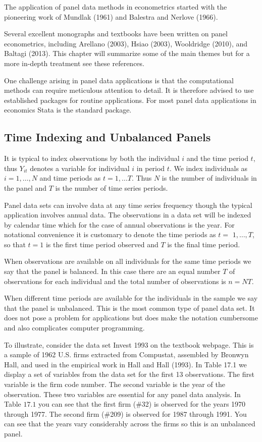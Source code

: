 \documentclass[10pt]{article}
\begin{document}
The application of panel data methods in econometrics started with the pioneering work of Mundlak (1961) and Balestra and Nerlove (1966).

Several excellent monographs and textbooks have been written on panel econometrics, including Arellano (2003), Hsiao (2003), Wooldridge (2010), and Baltagi (2013). This chapter will summarize some of the main themes but for a more in-depth treatment see these references.

One challenge arising in panel data applications is that the computational methods can require meticulous attention to detail. It is therefore advised to use established packages for routine applications. For most panel data applications in economics Stata is the standard package.

\subsection{Time Indexing and Unbalanced Panels}
It is typical to index observations by both the individual $i$ and the time period $t$, thus $Y_{i t}$ denotes a variable for individual $i$ in period $t$. We index individuals as $i=1, \ldots, N$ and time periods as $t=1, \ldots T$. Thus $N$ is the number of individuals in the panel and $T$ is the number of time series periods.

Panel data sets can involve data at any time series frequency though the typical application involves annual data. The observations in a data set will be indexed by calendar time which for the case of annual observations is the year. For notational convenience it is customary to denote the time periods as $t=$ $1, \ldots, T$, so that $t=1$ is the first time period observed and $T$ is the final time period.

When observations are available on all individuals for the same time periods we say that the panel is balanced. In this case there are an equal number $T$ of observations for each individual and the total number of observations is $n=N T$.

When different time periods are available for the individuals in the sample we say that the panel is unbalanced. This is the most common type of panel data set. It does not pose a problem for applications but does make the notation cumbersome and also complicates computer programming.

To illustrate, consider the data set Invest 1993 on the textbook webpage. This is a sample of 1962 U.S. firms extracted from Compustat, assembled by Bronwyn Hall, and used in the empirical work in Hall and Hall (1993). In Table 17.1 we display a set of variables from the data set for the first 13 observations. The first variable is the firm code number. The second variable is the year of the observation. These two variables are essential for any panel data analysis. In Table $17.1$ you can see that the first firm (\#32) is observed for the years 1970 through 1977. The second firm (\#209) is observed for 1987 through 1991. You can see that the years vary considerably across the firms so this is an unbalanced panel.
\end{document}
